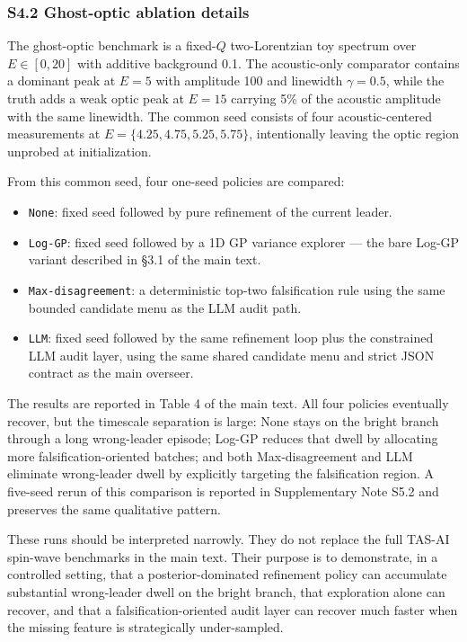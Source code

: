 \documentclass[
]{article}
\providecommand{\tightlist}{%
  \setlength{\itemsep}{0pt}\setlength{\parskip}{0pt}}
\begin{document}
\hypertarget{s4.2-ghost-optic-ablation-details}{%
\subsubsection{S4.2 Ghost-optic ablation
details}\label{s4.2-ghost-optic-ablation-details}}

The ghost-optic benchmark is a fixed-\(Q\) two-Lorentzian toy spectrum
over \(E\in[0,20]\) with additive background 0.1. The acoustic-only
comparator contains a dominant peak at \(E=5\) with amplitude 100 and
linewidth \(\gamma=0.5\), while the truth adds a weak optic peak at
\(E=15\) carrying 5\% of the acoustic amplitude with the same linewidth.
The common seed consists of four acoustic-centered measurements at
\(E=\{4.25,4.75,5.25,5.75\}\), intentionally leaving the optic region
unprobed at initialization.

From this common seed, four one-seed policies are compared:

\begin{itemize}
\tightlist
\item
  \texttt{None}: fixed seed followed by pure refinement of the current
  leader.
\item
  \texttt{Log-GP}: fixed seed followed by a 1D GP variance explorer ---
  the bare Log-GP variant described in §3.1 of the main text.
\item
  \texttt{Max-disagreement}: a deterministic top-two falsification rule
  using the same bounded candidate menu as the LLM audit path.
\item
  \texttt{LLM}: fixed seed followed by the same refinement loop plus the
  constrained LLM audit layer, using the same shared candidate menu and
  strict JSON contract as the main overseer.
\end{itemize}

The results are reported in Table 4 of the main text. All four policies
eventually recover, but the timescale separation is large: None stays on
the bright branch through a long wrong-leader episode; Log-GP reduces
that dwell by allocating more falsification-oriented batches; and both
Max-disagreement and LLM eliminate wrong-leader dwell by explicitly
targeting the falsification region. A five-seed rerun of this comparison
is reported in Supplementary Note S5.2 and preserves the same
qualitative pattern.

These runs should be interpreted narrowly. They do not replace the full
TAS-AI spin-wave benchmarks in the main text. Their purpose is to
demonstrate, in a controlled setting, that a posterior-dominated
refinement policy can accumulate substantial wrong-leader dwell on the
bright branch, that exploration alone can recover, and that a
falsification-oriented audit layer can recover much faster when the
missing feature is strategically under-sampled.
\end{document}
